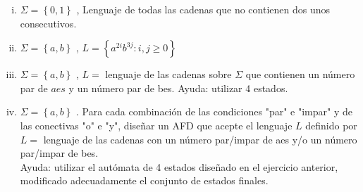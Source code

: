 \documentclass[
	12pt, %
]{fphw}
\begin{document}
\begin{enumerate}
\begin{enumerate}[(i)]
  \item $\Sigma = \left\lbrace 0,1 \right\rbrace$ , Lenguaje de todas las cadenas que no contienen dos unos consecutivos. \\
  \item $\Sigma = \left\lbrace a,b \right\rbrace$ , $L= \left\lbrace a^{2i} b^{3j} : i,j \geq 0 \right\rbrace$ \\
  \item $\Sigma = \left\lbrace a,b \right\rbrace$ , $L= $ lenguaje de las cadenas sobre $\Sigma$ que contienen un número par de $aes$ y un número par de bes. Ayuda: utilizar 4 estados.\\
  \item $\Sigma = \left\lbrace a,b \right\rbrace$ . Para cada combinación de las condiciones "par" e "impar" y de las conectivas "o" e "y", diseñar un AFD que acepte el lenguaje $L$ definido por\\
    $L= $ lenguaje de las cadenas con un número par/impar de aes y/o un número par/impar de bes.\\
    Ayuda: utilizar el autómata de 4 estados diseñado en el ejercicio anterior, modificado adecuadamente el conjunto de estados finales.
  \end{enumerate}
\end{enumerate}

\end{document}

